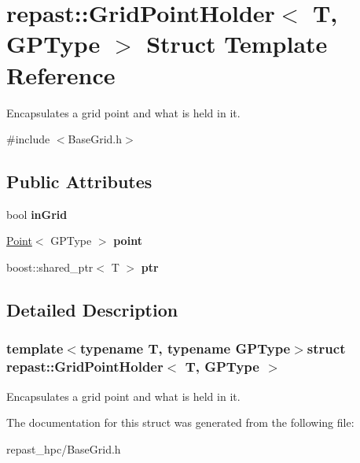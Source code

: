 \hypertarget{structrepast_1_1_grid_point_holder}{\section{repast\-:\-:Grid\-Point\-Holder$<$ T, G\-P\-Type $>$ Struct Template Reference}
\label{structrepast_1_1_grid_point_holder}
}


Encapsulates a grid point and what is held in it.  




{\ttfamily \#include $<$Base\-Grid.\-h$>$}

\subsection*{Public Attributes}
\begin{DoxyCompactItemize}
\item 
\hypertarget{structrepast_1_1_grid_point_holder_a11a11a29f6d73f6766a18ce83b9404a3}{bool {\bfseries in\-Grid}}\label{structrepast_1_1_grid_point_holder_a11a11a29f6d73f6766a18ce83b9404a3}

\item 
\hypertarget{structrepast_1_1_grid_point_holder_a9a290fdba30d1ea6de4f4314f52c2012}{\hyperlink{classrepast_1_1_point}{Point}$<$ G\-P\-Type $>$ {\bfseries point}}\label{structrepast_1_1_grid_point_holder_a9a290fdba30d1ea6de4f4314f52c2012}

\item 
\hypertarget{structrepast_1_1_grid_point_holder_a2f250cd6c9542010610957b75b8ff088}{boost\-::shared\-\_\-ptr$<$ T $>$ {\bfseries ptr}}\label{structrepast_1_1_grid_point_holder_a2f250cd6c9542010610957b75b8ff088}

\end{DoxyCompactItemize}


\subsection{Detailed Description}
\subsubsection*{template$<$typename T, typename G\-P\-Type$>$struct repast\-::\-Grid\-Point\-Holder$<$ T, G\-P\-Type $>$}

Encapsulates a grid point and what is held in it. 

The documentation for this struct was generated from the following file\-:\begin{DoxyCompactItemize}
\item 
repast\-\_\-hpc/Base\-Grid.\-h\end{DoxyCompactItemize}
